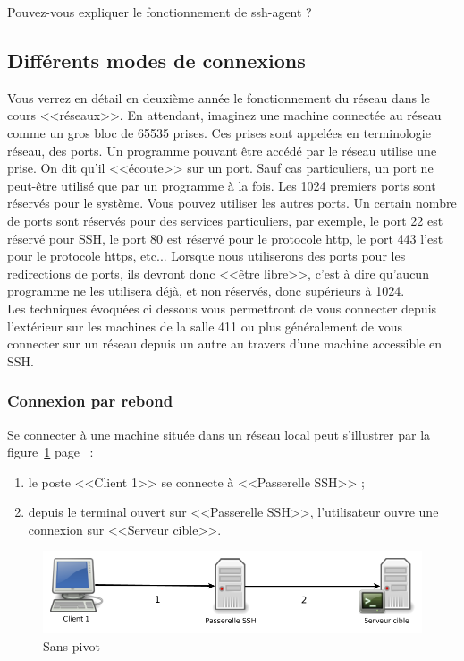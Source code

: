 \documentclass[11pt]{article}
\begin{document}
Pouvez-vous expliquer le fonctionnement de ssh-agent ?

\subsection{Différents modes de connexions}

Vous verrez en détail en deuxième année le fonctionnement du réseau dans le cours <<réseaux>>.
En attendant, imaginez une machine connectée au réseau comme un gros bloc de 65535 prises.
Ces prises sont appelées en terminologie réseau, des ports.
Un programme pouvant être accédé par le réseau utilise une prise.
On dit qu'il <<écoute>> sur un port.
Sauf cas particuliers, un port ne peut-être utilisé que par un programme à la fois.
Les 1024 premiers ports sont réservés pour le système.
Vous pouvez utiliser les autres ports.
Un certain nombre de ports sont réservés pour des services particuliers, par exemple, le port 22 est réservé pour SSH, le port 80 est réservé pour le protocole http, le port 443 l'est pour le protocole https, etc...
Lorsque nous utiliserons des ports pour les redirections de ports, ils devront donc <<être libre>>, c'est à dire qu'aucun programme ne les utilisera déjà, et non réservés, donc supérieurs à 1024.\\

Les techniques évoquées ci dessous vous permettront de vous connecter depuis l'extérieur sur les machines de la salle 411 ou plus généralement de vous connecter sur un réseau depuis un autre au travers d'une machine accessible en SSH.

\subsubsection{Connexion par rebond}

Se connecter à une machine située dans un réseau local peut s'illustrer par la figure~\ref{pivot_simple} page~\pageref{pivot_simple} :
\begin{enumerate}
 \item le poste <<Client 1>> se connecte à <<Passerelle SSH>> ;
 \item depuis le terminal ouvert sur <<Passerelle SSH>>, l'utilisateur ouvre une connexion sur <<Serveur cible>>.
\end{enumerate}

\begin{figure}[h]
 \centering
 \includegraphics[width=15cm]{pivotA}
 \caption{\label{pivot_simple}Sans pivot}
\end{figure}
\end{document}
